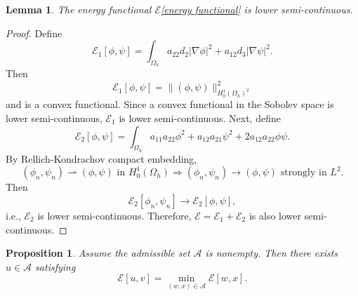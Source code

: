\documentclass[11pt]{amsart}
\numberwithin{equation}{section}
\theoremstyle{plain}
\newtheorem{lemma}[theorem]{Lemma}
\newtheorem{proposition}[theorem]{Proposition}
\theoremstyle{definition}
\begin{document}
\begin{lemma}
	The energy functional $\mathcal{E}$\cref{energy functional} is lower semi-continuous.
\end{lemma}

\begin{proof}
	Define
	\begin{equation*}
		\mathcal{E}_1[\phi,\psi]=\int_{\Omega_h}a_{22}d_2\lvert \nabla \phi \rvert ^2 + a_{12}d_3\lvert \nabla \psi \rvert ^2.
	\end{equation*}
	Then
	\begin{equation*}
		\mathcal{E}_1[\phi, \psi] = \lVert (\phi, \psi ) \rVert_{H_0^1(\Omega_h)^2}^2
	\end{equation*}
	and is a convex functional. Since a convex functional in the Sobolev space is lower semi-continuous, $\mathcal{E}_1$ is lower semi-continuous. Next, define
	\begin{equation*}
		\mathcal{E}_2[\phi, \psi]=\int_{\Omega_h}a_{11}a_{22}\phi^2+a_{12}a_{21}\psi^2+2a_{12}a_{22}\phi \psi.
	\end{equation*}
	By Rellich-Kondrachov compact embedding,
	\begin{equation*}
		(\phi_n, \psi_n) \rightharpoonup (\phi, \psi) \text{ in }H_0^1(\Omega_h) \Rightarrow(\phi_n,\psi_n)\to (\phi,\psi) \text{ strongly in }L^2.
	\end{equation*}
	Then
	\begin{equation*}
		\mathcal{E}_2[\phi_n,\psi_n] \to \mathcal{E}_2[\phi,\psi],
	\end{equation*}
	i.e., $\mathcal{E}_2$ is lower semi-continuous. Therefore, $\mathcal{E}=\mathcal{E}_1+\mathcal{E}_2$ is also lower semi-continuous.
\end{proof}

\begin{proposition} \label{theorem 4.13}
	Assume the admissible set $\mathcal{A}$ is nonempty. Then there exists $u\in\mathcal{A}$ satisfying
	\begin{equation*}
		\mathcal{E}[u, v]=\min_{(w,x)\in \mathcal{A}} \mathcal{E}[w,x].
	\end{equation*}
\end{proposition}
\end{document}
